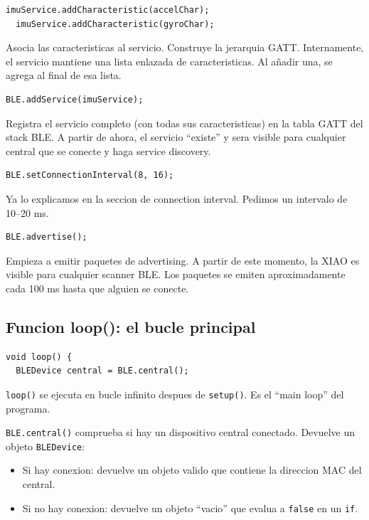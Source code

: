 \documentclass[11pt,a4paper]{article}
\begin{document}
\begin{lstlisting}[style=arduino]
  imuService.addCharacteristic(accelChar);
  imuService.addCharacteristic(gyroChar);
\end{lstlisting}

Asocia las caracteristicas al servicio. Construye la jerarquia GATT.
Internamente, el servicio mantiene una lista enlazada de
caracteristicas. Al añadir una, se agrega al final de esa lista.

\begin{lstlisting}[style=arduino]
  BLE.addService(imuService);
\end{lstlisting}

Registra el servicio completo (con todas sus caracteristicas) en la
tabla GATT del stack BLE. A partir de ahora, el servicio ``existe''
y sera visible para cualquier central que se conecte y haga service
discovery.

\begin{lstlisting}[style=arduino]
  BLE.setConnectionInterval(8, 16);
\end{lstlisting}

Ya lo explicamos en la seccion de connection interval. Pedimos un
intervalo de 10--20 ms.

\begin{lstlisting}[style=arduino]
  BLE.advertise();
\end{lstlisting}

Empieza a emitir paquetes de advertising. A partir de este momento,
la XIAO es visible para cualquier scanner BLE. Los paquetes se
emiten aproximadamente cada 100 ms hasta que alguien se conecte.

\subsection{Funcion loop(): el bucle principal}

\begin{lstlisting}[style=arduino]
void loop() {
  BLEDevice central = BLE.central();
\end{lstlisting}

\texttt{loop()} se ejecuta en bucle infinito despues de
\texttt{setup()}. Es el ``main loop'' del programa.

\texttt{BLE.central()} comprueba si hay un dispositivo central
conectado. Devuelve un objeto \texttt{BLEDevice}:
\begin{itemize}
    \item Si hay conexion: devuelve un objeto valido que contiene la
          direccion MAC del central.
    \item Si no hay conexion: devuelve un objeto ``vacio'' que
          evalua a \texttt{false} en un \texttt{if}.
\end{itemize}
\end{document}
